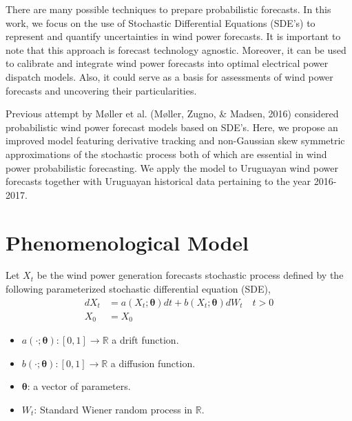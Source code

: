 \documentclass[10pt,twocolumn,letterpaper]{article}
\newcommand{\R}{\mathbb{R}}
\begin{document}
	There are many possible techniques to prepare probabilistic forecasts.  In this work, we focus on the use of Stochastic Differential Equations (SDE's) to represent and quantify uncertainties in wind power forecasts. It is important to note that this approach is  forecast technology agnostic. Moreover, it can be used to calibrate and integrate wind power forecasts into optimal electrical power dispatch models. Also, it could serve as a basis for assessments of wind power forecasts  and uncovering their particularities.

Previous attempt by M\o ller et al. (M\o ller, Zugno, \& Madsen, 2016)  considered probabilistic wind power forecast models based on SDE's. Here, we propose an improved model featuring derivative tracking and  non-Gaussian skew symmetric approximations of the stochastic process both of which are essential in wind power probabilistic forecasting. We apply the model to Uruguayan wind power forecasts together with Uruguayan historical data  pertaining to the year 2016-2017.

\section{Phenomenological  Model}

Let $X_t$ be the  wind power generation forecasts stochastic process defined by the  following parameterized stochastic differential equation (SDE),
\begin{equation}
\begin{split}
dX_t &= a(X_t; \bm{\theta}) dt + b (X_t; \bm{\theta} ) dW_t \quad t > 0 \\
X_0 & = X_0
\end{split}
\label{main}
\end{equation}

\begin{itemize}
\item $a(\cdot; \bm{\theta}):[0,1] \to \R $  a drift function.
\item $b (\cdot; \bm{\theta} ):[0,1] \to \R$  a  diffusion function.
\item $\bm{\theta}$: a vector of parameters.
\item $W_t$: Standard Wiener random process in $\R$.
\end{itemize}
\end{document}
